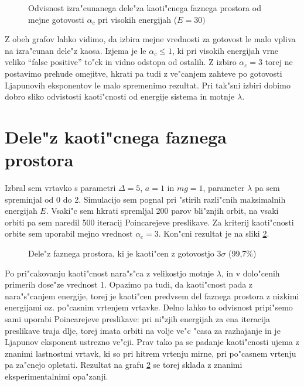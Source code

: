 \documentclass[a4paper,10pt]{article}
\begin{document}
\begin{figure}[H]
 
 \caption{Odvisnost izra"cunanega dele"za kaoti"cnega faznega prostora od mejne gotovosti $\alpha_c$ pri visokih energijah ($E=30)$}
 \label{fig:gotovost-30}
\end{figure}

Z obeh grafov lahko vidimo, da izbira mejne vrednosti za gotovost le malo vpliva na izra"cunan dele"z kaosa. Izjema je le $\alpha_c \leq 1$, ki pri visokih energijah vrne veliko ``false positive'' to"ck in vidno odstopa od ostalih. Z izbiro $\alpha_c = 3$ torej ne postavimo prehude omejitve, hkrati pa tudi z ve"canjem zahteve po gotovosti Ljapunovih eksponentov le malo spremenimo rezultat. Pri tak"sni izbiri dobimo dobro sliko odvistosti kaoti"cnosti od energije sistema in motnje $\lambda$. 


\section{Dele"z kaoti"cnega faznega prostora}
Izbral sem vrtavko s parametri $\Delta = 5$, $a=1$ in $mg = 1$, parameter $\lambda$ pa sem spreminjal od 0 do 2. Simulacijo sem pognal pri "stirih razli"cnih maksimalnih energijah $E$. Vsaki"c sem hkrati spremljal 200 parov bli"znjih orbit, na vsaki orbiti pa sem naredil 500 iteracij Poincarejeve preslikave. Za kriterij kaoti"cnosti orbite sem uporabil mejno vrednost $\alpha_c=3$. Kon"cni rezultat je na sliki \ref{fig:kaos}. 

\begin{figure}[H]
 \label{fig:kaos}
 
  \caption{Dele"z faznega prostora, ki je kaoti"cen z gotovostjo $3\sigma$ (99,7\%)}
\end{figure}

Po pri"cakovanju kaoti"cnost nara"s"ca z velikostjo motnje $\lambda$, in v dolo"cenih primerih dose"ze vrednost 1. Opazimo pa tudi, da kaoti"cnost pada z nara"s"canjem energije, torej je kaoti"cen predvsem del faznega prostora z nizkimi energijami oz. po"casnim vrtenjem vrtavke. Delno lahko to odvisnost pripi"semo sami uporabi Poincarejeve preslikave: pri ni"zjih energijah za ena iteracija preslikave traja dlje, torej imata orbiti na volje ve"c "casa za razhajanje in je Ljapunov eksponent ustrezno ve"cji. Prav tako pa se padanje kaoti"cnosti ujema z znanimi lastnostmi vrtavk, ki so pri hitrem vrtenju mirne, pri po"casnem vrtenju pa za"cnejo opletati. Rezultat na grafu \ref{fig:kaos} se torej sklada z znanimi eksperimentalnimi opa"zanji. 
\end{document}
